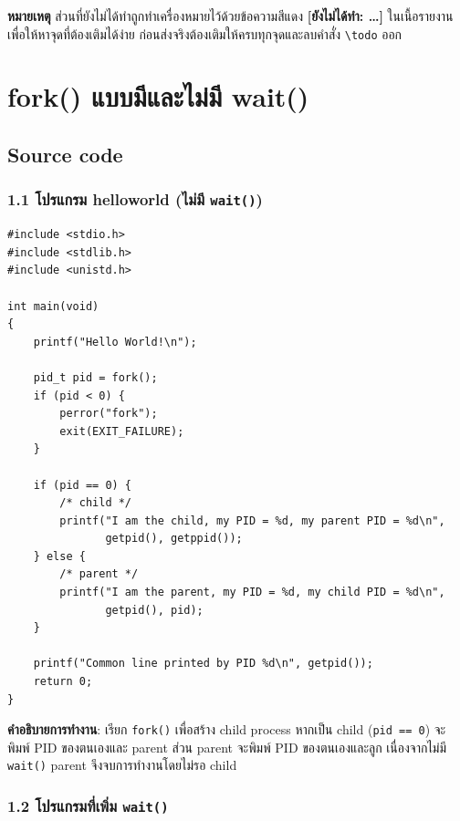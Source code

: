 \documentclass[a4paper,12pt]{article}
\newcommand{\code}[1]{\texttt{#1}}
\begin{document}
\textcolor{todored}{\textbf{หมายเหตุ}} ส่วนที่ยังไม่ได้ทำถูกทำเครื่องหมายไว้ด้วยข้อความสีแดง
\textbf{[ยังไม่ได้ทำ: \ldots]} ในเนื้อรายงาน เพื่อให้หาจุดที่ต้องเติมได้ง่าย
ก่อนส่งจริงต้องเติมให้ครบทุกจุดและลบคำสั่ง \code{\textbackslash todo} ออก

\newpage
\section{fork() แบบมีและไม่มี wait()}

\subsection{Source code}

\subsubsection{1.1 โปรแกรม helloworld (ไม่มี \code{wait()})}

\begin{lstlisting}[caption={q1\_1\_helloworld.c -- fork() without wait()},label={lst:q1_1}]
#include <stdio.h>
#include <stdlib.h>
#include <unistd.h>

int main(void)
{
    printf("Hello World!\n");

    pid_t pid = fork();
    if (pid < 0) {
        perror("fork");
        exit(EXIT_FAILURE);
    }

    if (pid == 0) {
        /* child */
        printf("I am the child, my PID = %d, my parent PID = %d\n",
               getpid(), getppid());
    } else {
        /* parent */
        printf("I am the parent, my PID = %d, my child PID = %d\n",
               getpid(), pid);
    }

    printf("Common line printed by PID %d\n", getpid());
    return 0;
}
\end{lstlisting}

\textbf{คำอธิบายการทำงาน}: เรียก \code{fork()} เพื่อสร้าง child process หากเป็น child (\code{pid == 0}) จะพิมพ์ PID ของตนเองและ parent ส่วน parent จะพิมพ์ PID ของตนเองและลูก เนื่องจากไม่มี \code{wait()} parent จึงจบการทำงานโดยไม่รอ child

\newpage

\subsubsection{1.2 โปรแกรมที่เพิ่ม \code{wait()}}
\end{document}
